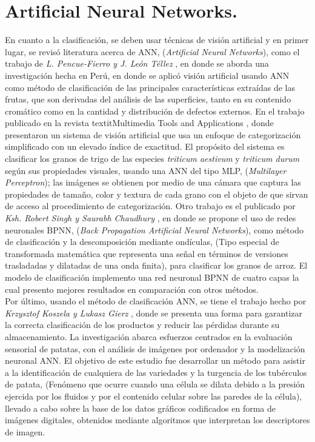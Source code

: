 \section{Artificial Neural Networks.}
	En cuanto a la clasificación, se deben usar técnicas de visión artificial y en primer lugar, se revisó literatura  acerca de ANN, (\textit{Artificial Neural Networks}), como el trabajo de \textit{L. Pencue-Fierro y J. León Téllez} \cite{article2}, en donde se aborda una investigación hecha en Perú, en donde se aplicó visión artificial usando ANN como método de clasificación de las principales características extraídas de las frutas, que son derivadas del análisis de las superficies, tanto en su contenido cromático como en la cantidad y distribución de defectos externos. En el trabajo publicado en la revista textit{Multimedia Tools and Applications} \cite{Shrivastava2017}, donde presentaron un sistema de visión artificial que usa un enfoque de categorización simplificado con un elevado índice de exactitud. El propósito del sistema es clasificar los granos de trigo de las especies \textit{triticum aestivum} y \textit{triticum durum} según sus propiedades visuales, usando una ANN del tipo MLP, (\textit{Multilayer Perceptron}); las imágenes se obtienen por medio de una cámara que captura las propiedades de tamaño, color y textura de cada grano con el objeto de que sirvan de acceso al procedimiento de categorización. Otro trabajo es el publicado por \textit{Ksh. Robert Singh y Saurabh Chaudhury} \cite{Singh2016}, en donde se propone el uso de redes neuronales BPNN, (\textit{Back Propagation Artificial Neural Networks}), como método de clasificación y la descomposición mediante ondículas, (Tipo especial de transformada matemática que representa una señal en términos de versiones trasladadas y dilatadas de una onda finita), para clasificar los granos de arroz. El modelo de clasificación implemento una red neuronal BPNN de cuatro capas la cual presento mejores resultados en comparación con otros métodos.\\
	
	Por último, usando el método de clasificación ANN, se tiene el trabajo hecho por \textit{Krzysztof Koszela y Lukasz Gierz} \cite{Przybyl2019}, donde se presenta una forma para garantizar la correcta clasificación de los productos y reducir las pérdidas durante su almacenamiento. La investigación abarca esfuerzos centrados en la evaluación sensorial de patatas, con el análisis de imágenes por ordenador y la modelización neuronal ANN. El objetivo de este estudio fue desarrollar un método para asistir a la identificación de cualquiera de las variedades y la turgencia de los tubérculos de patata, (Fenómeno que ocurre cuando una célula se dilata debido a la presión ejercida por los fluidos y por el contenido celular sobre las paredes de la célula), llevado a cabo sobre la base de los datos gráficos codificados en forma de imágenes digitales, obtenidos mediante algoritmos que interpretan los descriptores de imagen.\\

